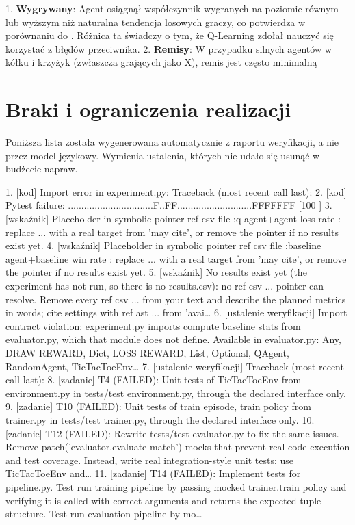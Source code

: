 \documentclass[conference]{IEEEtran}
\renewcommand{\texttt}[1]{\ifmmode\mathtt{#1}\else{\normalfont\ttfamily #1}\fi}
\begin{document}
1. \textbf{Wygrywany}: Agent osiągnął współczynnik wygranych na poziomie równym lub wyższym niż naturalna tendencja losowych graczy, co potwierdza \texttt{value} w porównaniu do \texttt{value}. Różnica ta świadczy o tym, że Q-Learning zdołał nauczyć się korzystać z błędów przeciwnika.
2. \textbf{Remisy}: W przypadku silnych agentów w kółku i krzyżyk (zwłaszcza grających jako X), remis jest często minimalną

\section{Braki i ograniczenia realizacji}
Poniższa lista została wygenerowana automatycznie z raportu weryfikacji, a nie przez model językowy. Wymienia ustalenia, których nie udało się usunąć w budżecie napraw.

1. [kod] Import error in experiment.py: Traceback (most recent call last):
2. [kod] Pytest failure: ................................F..FF............................FFFFFFF [100 ]
3. [wskaźnik] Placeholder in symbolic pointer ref csv file :q agent+agent loss rate : replace ... with a real target from 'may cite', or remove the pointer if no results exist yet.
4. [wskaźnik] Placeholder in symbolic pointer ref csv file :baseline agent+baseline win rate : replace ... with a real target from 'may cite', or remove the pointer if no results exist yet.
5. [wskaźnik] No results exist yet (the experiment has not run, so there is no results.csv): no ref csv ... pointer can resolve. Remove every ref csv ... from your text and describe the planned metrics in words; cite settings with ref ast ... from 'avai…
6. [ustalenie weryfikacji] Import contract violation: experiment.py imports compute baseline stats from evaluator.py, which that module does not define. Available in evaluator.py: Any, DRAW REWARD, Dict, LOSS REWARD, List, Optional, QAgent, RandomAgent, TicTacToeEnv…
7. [ustalenie weryfikacji] Traceback (most recent call last):
8. [zadanie] T4 (FAILED): Unit tests of TicTacToeEnv from environment.py in tests/test environment.py, through the declared interface only.
9. [zadanie] T10 (FAILED): Unit tests of train episode, train policy from trainer.py in tests/test trainer.py, through the declared interface only.
10. [zadanie] T12 (FAILED): Rewrite tests/test evaluator.py to fix the same issues. Remove patch('evaluator.evaluate match') mocks that prevent real code execution and test coverage. Instead, write real integration-style unit tests: use TicTacToeEnv and…
11. [zadanie] T14 (FAILED): Implement tests for pipeline.py. Test run training pipeline by passing mocked trainer.train policy and verifying it is called with correct arguments and returns the expected tuple structure. Test run evaluation pipeline by mo…
\end{document}
